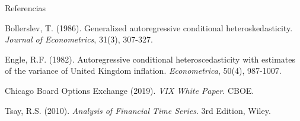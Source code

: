 \begin{frame}{Referencias}
    \begin{thebibliography}{9}
        Bollerslev, T. (1986). Generalized autoregressive conditional heteroskedasticity. \textit{Journal of Econometrics}, 31(3), 307-327.
        
        Engle, R.F. (1982). Autoregressive conditional heteroscedasticity with estimates of the variance of United Kingdom inflation. \textit{Econometrica}, 50(4), 987-1007.
        
        Chicago Board Options Exchange (2019). \textit{VIX White Paper}. CBOE.
        
        Tsay, R.S. (2010). \textit{Analysis of Financial Time Series}. 3rd Edition, Wiley.
    \end{thebibliography}
\end{frame}